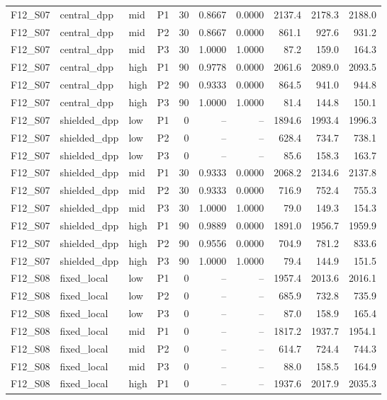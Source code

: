 \begin{longtable}{llllrrrrrr}
F12\_S07 & central\_dpp & mid & P1 & 30 & 0.8667 & 0.0000 & 2137.4 & 2178.3 & 2188.0 \\
F12\_S07 & central\_dpp & mid & P2 & 30 & 0.8667 & 0.0000 & 861.1 & 927.6 & 931.2 \\
F12\_S07 & central\_dpp & mid & P3 & 30 & 1.0000 & 1.0000 & 87.2 & 159.0 & 164.3 \\
F12\_S07 & central\_dpp & high & P1 & 90 & 0.9778 & 0.0000 & 2061.6 & 2089.0 & 2093.5 \\
F12\_S07 & central\_dpp & high & P2 & 90 & 0.9333 & 0.0000 & 864.5 & 941.0 & 944.8 \\
F12\_S07 & central\_dpp & high & P3 & 90 & 1.0000 & 1.0000 & 81.4 & 144.8 & 150.1 \\
F12\_S07 & shielded\_dpp & low & P1 & 0 & -- & -- & 1894.6 & 1993.4 & 1996.3 \\
F12\_S07 & shielded\_dpp & low & P2 & 0 & -- & -- & 628.4 & 734.7 & 738.1 \\
F12\_S07 & shielded\_dpp & low & P3 & 0 & -- & -- & 85.6 & 158.3 & 163.7 \\
F12\_S07 & shielded\_dpp & mid & P1 & 30 & 0.9333 & 0.0000 & 2068.2 & 2134.6 & 2137.8 \\
F12\_S07 & shielded\_dpp & mid & P2 & 30 & 0.9333 & 0.0000 & 716.9 & 752.4 & 755.3 \\
F12\_S07 & shielded\_dpp & mid & P3 & 30 & 1.0000 & 1.0000 & 79.0 & 149.3 & 154.3 \\
F12\_S07 & shielded\_dpp & high & P1 & 90 & 0.9889 & 0.0000 & 1891.0 & 1956.7 & 1959.9 \\
F12\_S07 & shielded\_dpp & high & P2 & 90 & 0.9556 & 0.0000 & 704.9 & 781.2 & 833.6 \\
F12\_S07 & shielded\_dpp & high & P3 & 90 & 1.0000 & 1.0000 & 79.4 & 144.9 & 151.5 \\
F12\_S08 & fixed\_local & low & P1 & 0 & -- & -- & 1957.4 & 2013.6 & 2016.1 \\
F12\_S08 & fixed\_local & low & P2 & 0 & -- & -- & 685.9 & 732.8 & 735.9 \\
F12\_S08 & fixed\_local & low & P3 & 0 & -- & -- & 87.0 & 158.9 & 165.4 \\
F12\_S08 & fixed\_local & mid & P1 & 0 & -- & -- & 1817.2 & 1937.7 & 1954.1 \\
F12\_S08 & fixed\_local & mid & P2 & 0 & -- & -- & 614.7 & 724.4 & 744.3 \\
F12\_S08 & fixed\_local & mid & P3 & 0 & -- & -- & 88.0 & 158.5 & 164.9 \\
F12\_S08 & fixed\_local & high & P1 & 0 & -- & -- & 1937.6 & 2017.9 & 2035.3 \\

\end{longtable}

